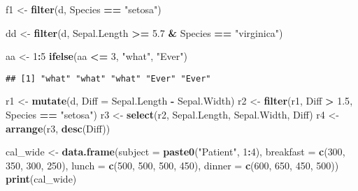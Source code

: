 \documentclass[]{article}
\newenvironment{Shaded}{\begin{snugshade}}{\end{snugshade}}
\newcommand{\DataTypeTok}[1]{\textcolor[rgb]{0.13,0.29,0.53}{#1}}
\newcommand{\DecValTok}[1]{\textcolor[rgb]{0.00,0.00,0.81}{#1}}
\newcommand{\FloatTok}[1]{\textcolor[rgb]{0.00,0.00,0.81}{#1}}
\newcommand{\KeywordTok}[1]{\textcolor[rgb]{0.13,0.29,0.53}{\textbf{#1}}}
\newcommand{\NormalTok}[1]{#1}
\newcommand{\OperatorTok}[1]{\textcolor[rgb]{0.81,0.36,0.00}{\textbf{#1}}}
\newcommand{\StringTok}[1]{\textcolor[rgb]{0.31,0.60,0.02}{#1}}
\begin{document}
\begin{Shaded}
\begin{Highlighting}[]
\NormalTok{f1 <-}\StringTok{ }\KeywordTok{filter}\NormalTok{(d, Species }\OperatorTok{==}\StringTok{ "setosa"}\NormalTok{)}

\NormalTok{dd <-}\StringTok{ }\KeywordTok{filter}\NormalTok{(d, Sepal.Length }\OperatorTok{>=}\StringTok{ }\FloatTok{5.7} \OperatorTok{&}\StringTok{ }\NormalTok{Species }\OperatorTok{==}\StringTok{ "virginica"}\NormalTok{)}
\end{Highlighting}
\end{Shaded}

\begin{Shaded}
\begin{Highlighting}[]
\NormalTok{aa <-}\StringTok{ }\DecValTok{1}\OperatorTok{:}\DecValTok{5}
\KeywordTok{ifelse}\NormalTok{(aa }\OperatorTok{<=}\StringTok{ }\DecValTok{3}\NormalTok{, }\StringTok{"what"}\NormalTok{, }\StringTok{"Ever"}\NormalTok{)}
\end{Highlighting}
\end{Shaded}

\begin{verbatim}
## [1] "what" "what" "what" "Ever" "Ever"
\end{verbatim}

\begin{Shaded}
\begin{Highlighting}[]
\NormalTok{r1 <-}\StringTok{ }\KeywordTok{mutate}\NormalTok{(d, }\DataTypeTok{Diff =}\NormalTok{ Sepal.Length }\OperatorTok{-}\StringTok{ }\NormalTok{Sepal.Width)}
\NormalTok{r2 <-}\StringTok{ }\KeywordTok{filter}\NormalTok{(r1, Diff }\OperatorTok{>}\StringTok{ }\FloatTok{1.5}\NormalTok{, Species }\OperatorTok{==}\StringTok{ "setosa"}\NormalTok{)}
\NormalTok{r3 <-}\StringTok{ }\KeywordTok{select}\NormalTok{(r2, Sepal.Length, Sepal.Width, Diff)}
\NormalTok{r4 <-}\StringTok{ }\KeywordTok{arrange}\NormalTok{(r3, }\KeywordTok{desc}\NormalTok{(Diff))}
\end{Highlighting}
\end{Shaded}

\begin{Shaded}
\begin{Highlighting}[]
\NormalTok{cal_wide <-}\StringTok{ }\KeywordTok{data.frame}\NormalTok{(}\DataTypeTok{subject =} \KeywordTok{paste0}\NormalTok{(}\StringTok{"Patient"}\NormalTok{, }\DecValTok{1}\OperatorTok{:}\DecValTok{4}\NormalTok{),}
                      \DataTypeTok{breakfast =} \KeywordTok{c}\NormalTok{(}\DecValTok{300}\NormalTok{, }\DecValTok{350}\NormalTok{, }\DecValTok{300}\NormalTok{, }\DecValTok{250}\NormalTok{),}
                      \DataTypeTok{lunch =} \KeywordTok{c}\NormalTok{(}\DecValTok{500}\NormalTok{, }\DecValTok{500}\NormalTok{, }\DecValTok{500}\NormalTok{, }\DecValTok{450}\NormalTok{),}
                      \DataTypeTok{dinner =} \KeywordTok{c}\NormalTok{(}\DecValTok{600}\NormalTok{, }\DecValTok{650}\NormalTok{, }\DecValTok{450}\NormalTok{, }\DecValTok{500}\NormalTok{))}
\KeywordTok{print}\NormalTok{(cal_wide)}
\end{Highlighting}
\end{Shaded}
\end{document}
